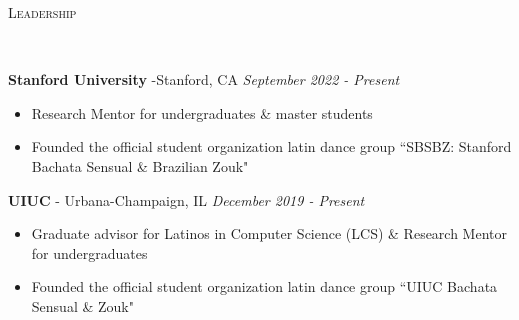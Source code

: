 \documentclass{article}
\newenvironment{changemargin}[2]{%
  \begin{list}{}{%
    \setlength{\topsep}{0pt}%
    \setlength{\leftmargin}{#1}%
    \setlength{\rightmargin}{#2}%
    \setlength{\listparindent}{\parindent}%
    \setlength{\itemindent}{\parindent}%
    \setlength{\parsep}{\parskip}%
  }%
  \item[]}{\end{list}
}
\newcommand{\lineover}{
	\begin{changemargin}{-0.05in}{-0.05in}
		\vspace*{-8pt}
		\hrulefill \\
		\vspace*{-2pt}
	\end{changemargin}
}
\newcommand{\header}[1]{
	\begin{changemargin}{-0.5in}{-0.5in}
		\scshape{#1}\\
  	\lineover
	\end{changemargin}
}
\newenvironment{body} {
	\vspace*{-16pt}
	\begin{changemargin}{-0.25in}{-0.5in}
  }	
	{\end{changemargin}
}
\begin{document}
\medskip

\header{Leadership}

\begin{body}
    \vspace{11pt}

\vspace{5pt}
\textbf{Stanford University} -Stanford, CA \hfill \emph{September 2022 - Present}\\
\vspace*{-3pt}
\begin{itemize} \itemsep -2pt  %
    \item Research Mentor for undergraduates \& master students
    \item Founded the official student organization latin dance group ``SBSBZ: Stanford Bachata Sensual \& Brazilian Zouk"
\end{itemize}
\vspace{5 pt}

\vspace{5pt}
\textbf{UIUC} - Urbana-Champaign, IL \hfill \emph{December 2019 - Present}\\
\vspace*{-3pt}
\begin{itemize} \itemsep -2pt  %
    \item Graduate advisor for Latinos in Computer Science (LCS) \& Research Mentor for undergraduates
    \item Founded the official student organization latin dance group ``UIUC Bachata Sensual \& Zouk"
\end{itemize}


    

\end{body}
\end{document}
